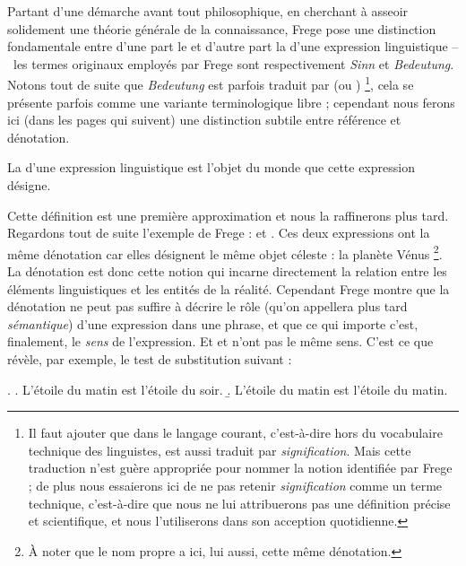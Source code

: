 Partant d'une démarche avant tout philosophique, en cherchant à
asseoir solidement une théorie générale de la connaissance, 
Frege pose une distinction fondamentale entre d'une part le  
et  d'autre part la
 d'une expression linguistique
--~les termes originaux employés par Frege sont
respectivement \emph{Sinn} et 
\emph{Bedeutung}.   Notons tout de suite que \emph{Bedeutung} est
parfois traduit par  (ou )%
\footnote{Il faut ajouter que dans le langage courant,
  c'est-à-dire hors du vocabulaire technique des linguistes,
   est aussi traduit par \emph{signification}. Mais
  cette traduction n'est guère appropriée pour nommer la notion
  identifiée par Frege ; de plus nous essaierons ici de ne pas retenir
  \emph{signification} comme un terme technique, c'est-à-dire que
  nous ne lui attribuerons pas une définition précise et scientifique,
  et nous l'utiliserons dans son acception quotidienne.}, 
cela se présente parfois comme une variante terminologique libre ;
  cependant  nous 
ferons ici (dans les pages qui suivent) une distinction subtile entre 
référence et dénotation.

\largerpage[-1]

\begin{defi}[Dénotation]
La  d'une expression linguistique est l'objet du monde que
cette expression désigne.  
\end{defi}
Cette définition est une première
approximation et nous la raffinerons plus tard.  Regardons tout de
suite l'exemple de Frege :  et
.  Ces deux expressions ont la même
dénotation car elles 
désignent le même objet céleste : la planète Vénus%
\footnote{À noter que
le nom propre  a ici, lui aussi, cette même
dénotation.}.  
La dénotation est donc cette notion qui incarne directement la
relation entre les éléments linguistiques et les entités de la réalité.
Cependant Frege montre que la dénotation ne peut pas suffire à décrire le
rôle (qu'on appellera plus tard \emph{sémantique}) d'une expression
dans une phrase,
 et que ce qui importe c'est, finalement, le
\emph{sens} de l'expression.  Et  et
 n'ont pas le même sens.  C'est ce que révèle,
par exemple, le test de substitution suivant :

\ex.  
\a. \label{xesoir}
L'étoile du matin est l'étoile du soir.
\b.
\label{xemat}
L'étoile du matin est l'étoile du matin.


